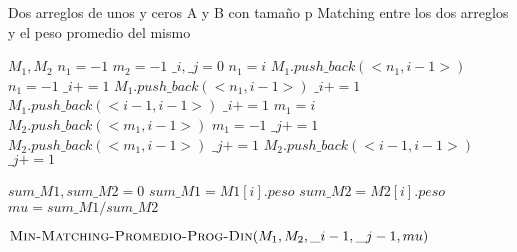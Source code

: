 \documentclass[12pt]{article}
\newcommand{\TITLE}[1]{\item[#1]}
\begin{document}
\begin{algorithmic}[1]
    \REQUIRE Dos arreglos de unos y ceros A y B con tamaño p
    \ENSURE Matching entre los dos arreglos y el peso promedio del mismo
    \TITLE{\textsc{Min-Matching-Promedio-Prog-Din}$(A,B,p)$}                                                 
    \STATE $M_1,M_2$         
    \STATE $n_1 = -1$                                                               
    \STATE $m_2 = -1$                                                               
    \STATE $\_i,\_j = 0$                                                            
            \STATE $n_1 = i$                                                        
            \STATE $M_1.push\_back(<n_1,i-1>)$                
            \STATE $n_1 = -1$                                          
            \STATE $\_i += 1$                                          
        \ENDIF
            \STATE $M_1.push\_back(<n_1,i-1>)$                              
            \STATE $\_i += 1$                                               
            \STATE $M_1.push\_back(<i-1,i-1>)$                       
            \STATE $\_i += 1$                                                      
        \ENDIF
            \STATE $m_1 = i$                                             
            \STATE $M_2.push\_back(<m_1,i-1>)$                      
            \STATE $m_1 = -1$               
            \STATE $\_j += 1$  
        \ENDIF
            \STATE $M_2.push\_back(<m_1,i-1>)$                                
            \STATE $\_j += 1$                                                  
            \STATE $M_2.push\_back(<i-1,i-1>)$ 
            \STATE $\_j += 1$  
        \ENDIF
    \ENDFOR
    
    \STATE $sum\_M1, sum\_M2 = 0$
        \STATE $sum\_M1 = M1[i].peso$
    \ENDFOR
        \STATE $sum\_M2 = M2[i].peso$
    \ENDFOR
    \STATE $mu = sum\_M1 / sum\_M2$
    
    \RETURN $\textsc{Min-Matching-Promedio-Prog-Din}(M_1,M_2,\_i-1,\_j-1, mu)$
\end{algorithmic}
\end{document}
